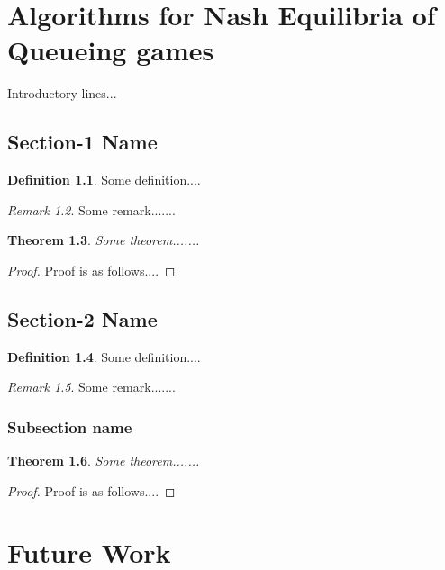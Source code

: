 \documentclass[12pt,a4paper]{report}
\theoremstyle{plain}
\newtheorem{theorem}{Theorem}[section]
\theoremstyle{definition}
\newtheorem{definition}[theorem]{Definition}
\theoremstyle{remark}
\newtheorem{remark}[theorem]{Remark}
\begin{document}
\chapter{Algorithms for Nash Equilibria of Queueing games}

Introductory lines...



\section{Section-1 Name}
\begin{definition}\label{abc5}
Some definition....
\end{definition}

\begin{remark}
Some remark.......
\end{remark}



\begin{theorem}
Some theorem.......
\end{theorem}

\begin{proof}
Proof is as follows....
\end{proof}

\section{Section-2 Name}
\begin{definition}\label{abc6}
Some definition....
\end{definition}

\begin{remark}
Some remark.......
\end{remark}

\subsection{Subsection name}

\begin{theorem}
Some theorem.......
\end{theorem}

\begin{proof}
Proof is as follows....
\end{proof}



\chapter{Future Work}
\end{document}
